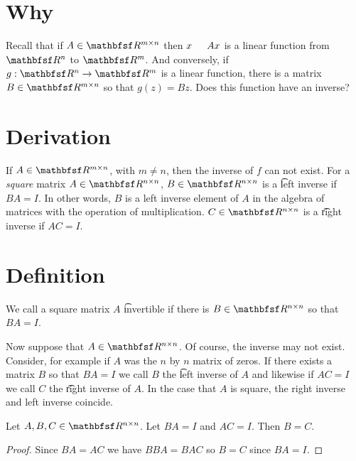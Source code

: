
\section*{Why}

Recall that if $A \in \R ^{m \times n}$ then $x \indent Ax$ is a linear function from $\R ^{n}$ to $\R ^{m}$.
And conversely, if $g: \R ^n \to \R ^m$ is a linear function, there is a matrix $B \in \R ^{m \times n}$ so that $g(z) = Bz$.
Does this function have an inverse?

\section*{Derivation}

If $A \in \R ^{m \times n}$, with $m \neq n$, then the inverse of $f$ can not exist.
For a \textit{square} matrix $A \in \R ^{n \times n}$, $B \in \R ^{n \times n}$ is a \t{left inverse} if $BA = I$.
In other words, $B$ is a left inverse element of $A$ in the algebra of matrices with the operation of multiplication.
$C \in \R ^{n \times n}$ is a \t{right inverse} if $AC = I$.

\section*{Definition}

We call a square matrix $A$ \t{invertible} if there is $B \in \R ^{n \times n}$ so that $BA = I$.

Now suppose that $A \in \R ^{n \times n}$.
Of course, the inverse may not exist.
Consider, for example if $A$ was the $n$ by $n$ matrix of zeros.
If there exists a matrix $B$ so that $BA = I$ we call $B$ the \t{left inverse} of $A$ and likewise if $AC = I$ we call $C$ the \t{right inverse} of $A$.
In the case that $A$ is square, the right inverse and left inverse coincide.

\begin{proposition}
Let $A, B, C \in \R ^{n \times n}$.
Let $BA = I$ and $AC = I$.
Then $B = C$.
\begin{proof}
Since $BA = AC$ we have $BBA = BAC$ so $B = C$ since $BA = I$.
\end{proof}
\end{proposition}

\blankpage